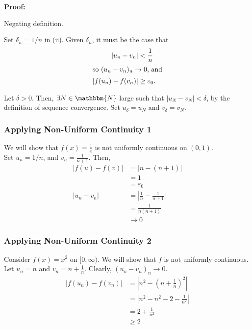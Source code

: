 \documentclass[10pt]{extarticle}
\newcommand{\N}{\mathbbm{N}}
\begin{document}
    \textbf{Proof:}
    \begin{description}[font=\normalfont]
      \item[(i) $\Leftrightarrow$ (ii):] Negating definition.
      \item[(ii) $\Rightarrow$ (iii):] Set $\delta_n = 1/n$ in (ii). Given $\delta_n$, it must be the case that
        \begin{align*}
          |u_n - v_n| &< \frac{1}{n}\\
          \shortintertext{so $(u_n - v_n)_n \rightarrow 0$, and}
          |f(u_n) - f(v_n)| &\geq \varepsilon_0.
        \end{align*}
      \item[(iii) $\Rightarrow$ (ii):] Let $\delta > 0$. Then, $\exists N\in \N$ large such that $|u_N - v_N| < \delta$, by the definition of sequence convergence. Set $u_{\delta} = u_N$ and $v_{\delta} = v_N$.
    \end{description}
    \subsubsection{Applying Non-Uniform Continuity 1}%
    We will show that $f(x) = \frac{1}{x}$ is not uniformly continuous on $(0,1)$.\\

    Set $u_n = 1/n$, and $v_n = \frac{1}{n+1}$. Then,
    \begin{align*}
      |f(u) - f(v)| &= |n-(n+1)|\\
                    &= 1\\
                    &=\varepsilon_0\\
      |u_n - v_n| &= \left|\frac{1}{n} - \frac{1}{n+1}\right|\\
                  &= \frac{1}{n(n+1)}\\
                  &\rightarrow 0
    \end{align*}
    \subsubsection{Applying Non-Uniform Continuity 2}%
    Consider $f(x) = x^2$ on $[0,\infty)$. We will show that $f$ is not uniformly continuous.\\

    Let $u_n = n$ and $v_n = n + \frac{1}{n}$. Clearly, $(u_n - v_n)_n \rightarrow 0$.
    \begin{align*}
      |f(u_n) - f(v_n)| &= \left|n^2 - \left(n+\frac{1}{n}\right)^2\right|\\
                        &= \left|n^2 - n^2 - 2 - \frac{1}{n^2}\right|\\
                        &= 2 + \frac{1}{n^2}\\
                        &\geq 2
    \end{align*}
\end{document}
